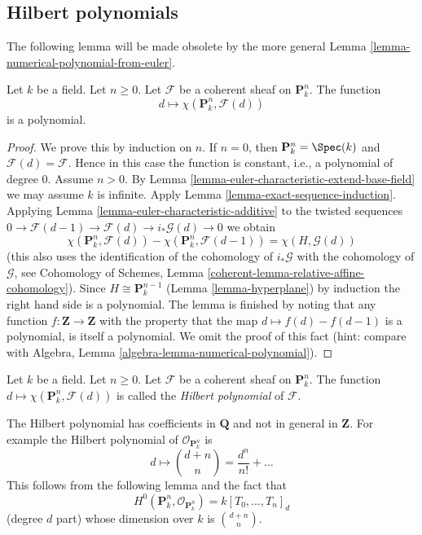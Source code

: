 \subsection{Hilbert polynomials}
\label{subsection-hilbert}

\noindent
The following lemma will be made obsolete by the more general
Lemma \ref{lemma-numerical-polynomial-from-euler}.

\begin{lemma}
\label{lemma-hilbert-polynomial}
Let $k$ be a field. Let $n \geq 0$. Let $\mathcal{F}$ be a coherent sheaf
on $\mathbf{P}^n_k$. The function
$$
d \longmapsto \chi(\mathbf{P}^n_k, \mathcal{F}(d))
$$
is a polynomial.
\end{lemma}

\begin{proof}
We prove this by induction on $n$. If $n = 0$, then
$\mathbf{P}^n_k = \Spec(k)$ and $\mathcal{F}(d) = \mathcal{F}$.
Hence in this case the function is constant, i.e., a polynomial
of degree $0$. Assume $n > 0$. By
Lemma \ref{lemma-euler-characteristic-extend-base-field}
we may assume $k$ is infinite. Apply
Lemma \ref{lemma-exact-sequence-induction}.
Applying Lemma \ref{lemma-euler-characteristic-additive}
to the twisted sequences
$0 \to \mathcal{F}(d - 1) \to \mathcal{F}(d) \to i_*\mathcal{G}(d) \to 0$
we obtain
$$
\chi(\mathbf{P}^n_k, \mathcal{F}(d)) -
\chi(\mathbf{P}^n_k, \mathcal{F}(d - 1)) =
\chi(H, \mathcal{G}(d))
$$
(this also uses the identification of the cohomology of
$i_*\mathcal{G}$ with the cohomology of $\mathcal{G}$, see
Cohomology of Schemes, Lemma \ref{coherent-lemma-relative-affine-cohomology}).
Since $H \cong \mathbf{P}^{n - 1}_k$ (Lemma \ref{lemma-hyperplane})
by induction the right hand side is a polynomial.
The lemma is finished by noting that any function
$f : \mathbf{Z} \to \mathbf{Z}$ with the property that the map
$d \mapsto f(d) - f(d - 1)$ is a polynomial, is itself a polynomial.
We omit the proof of this fact (hint: compare with
Algebra, Lemma \ref{algebra-lemma-numerical-polynomial}).
\end{proof}

\begin{definition}
\label{definition-hilbert-polynomial}
Let $k$ be a field. Let $n \geq 0$. Let $\mathcal{F}$ be a coherent sheaf
on $\mathbf{P}^n_k$. The function
$d \mapsto \chi(\mathbf{P}^n_k, \mathcal{F}(d))$ is called the
{\it Hilbert polynomial} of $\mathcal{F}$.
\end{definition}

\noindent
The Hilbert polynomial has coefficients in $\mathbf{Q}$ and not
in general in $\mathbf{Z}$. For example the Hilbert polynomial
of $\mathcal{O}_{\mathbf{P}^n_k}$ is
$$
d \longmapsto {d + n \choose n} = \frac{d^n}{n!} + \ldots
$$
This follows from the following lemma and the fact that
$$
H^0(\mathbf{P}^n_k, \mathcal{O}_{\mathbf{P}^n_k}) = k[T_0, \ldots, T_n]_d
$$
(degree $d$ part) whose dimension over $k$ is ${d + n \choose n}$.

